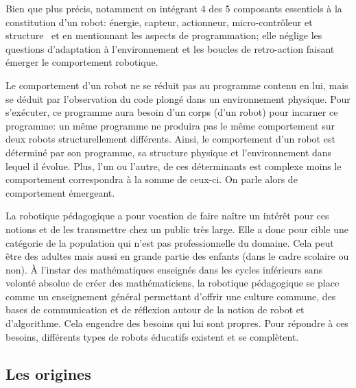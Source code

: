             Bien que plus précis, notamment en intégrant 4 des 5 composants essentiels à la constitution d'un robot: énergie, capteur, actionneur, micro-contrôleur et structure~ et en mentionnant les aspects de programmation; elle néglige les questions d'adaptation à l'environnement et les boucles de retro-action faisant émerger le comportement robotique.\par%
            Le comportement d'un robot ne se réduit pas au programme contenu en lui, mais se déduit par l'observation du code plongé dans un environnement physique. Pour s'exécuter, ce programme aura besoin d'un corps (d'un robot) pour incarner ce programme: un même programme ne produira pas le même comportement sur deux robots structurellement différents. Ainsi, le comportement d'un robot est déterminé par son programme, sa structure physique et l'environnement dans lequel il évolue. Plus, l'un ou l'autre, de ces déterminants est complexe moins le comportement correspondra à la somme de ceux-ci. On parle alors de comportement émergeant.\par%
        La robotique pédagogique a pour vocation de faire naître un intérêt pour ces notions et de les transmettre chez un public très large.
        Elle a donc pour cible une catégorie de la population qui n'est pas professionnelle du domaine. Cela peut être des adultes mais aussi en grande partie des enfants (dans le cadre scolaire ou non).
        À l'instar des mathématiques enseignés dans les cycles inférieurs sans volonté absolue de créer des mathématiciens, la robotique pédagogique se place comme un enseignement général permettant d'offrir une culture commune, des bases de communication et de réflexion autour de la notion de robot et d'algorithme.
        Cela engendre des besoins qui lui sont propres. Pour répondre à ces besoins, différents types de robots éducatifs existent et se complètent.
    \subsection{Les origines}
